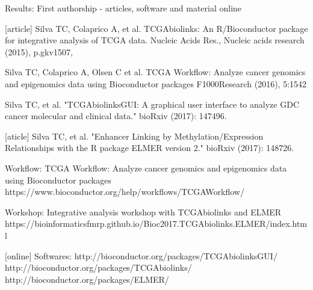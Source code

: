 \documentclass[slidestop,compress,11pt,xcolor=dvipsnames]{beamer}
\begin{document}
\begin{frame}{Results: First authorship - articles, software and material online}
\begin{thebibliography}{10}
\tiny
{}[article]
Silva TC, Colaprico A, et al.
\newblock TCGAbiolinks: An R/Bioconductor package for integrative analysis of TCGA data. Nucleic Acids Res.,
\newblock Nucleic acids research (2015), p.gkv1507, 

\beamertemplatearticlebibitems
{}
Silva TC, Colaprico A, Olsen C et al.
\newblock TCGA Workflow: Analyze cancer genomics and epigenomics data using Bioconductor packages
\newblock  F1000Research (2016), 5:1542

\beamertemplatearticlebibitems
{}
Silva TC, et al.
\newblock "TCGAbiolinksGUI: A graphical user interface to analyze GDC cancer molecular and clinical data."
\newblock bioRxiv (2017): 147496.

[aticle]
Silva TC, et al.
\newblock "Enhancer Linking by Methylation/Expression Relationships with the R package ELMER version 2."
\newblock  bioRxiv (2017): 148726.

\beamertemplateonlinebibitems
{}
Workflow:
\newblock TCGA Workflow: Analyze cancer genomics and epigenomics data using Bioconductor packages\\
 https://www.bioconductor.org/help/workflows/TCGAWorkflow/

\beamertemplateonlinebibitems
{}
Workshop:
\newblock Integrative analysis workshop with TCGAbiolinks and ELMER\\ https://bioinformaticsfmrp.github.io/Bioc2017.TCGAbiolinks.ELMER/index.html

[online]
  Softwares:
  \newblock http://bioconductor.org/packages/TCGAbiolinksGUI/\\ http://bioconductor.org/packages/TCGAbiolinks/\\ http://bioconductor.org/packages/ELMER/


 \end{thebibliography}
\end{frame}
\end{document}
